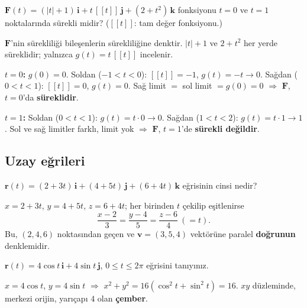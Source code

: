 \begin{soru}
$\mathbf F(t)=(|t|+1)\,\mathbf i+t\,[\![t]\!]\,\mathbf j+(2+t^2)\,\mathbf k$ fonksiyonu $t=0$ ve $t=1$ noktalarında sürekli midir?
($[\![t]\!]$: tam değer fonksiyonu.)
\end{soru}
\begin{cevap}
$\mathbf F$'nin sürekliliği bileşenlerin sürekliliğine denktir. $|t|+1$ ve $2+t^2$ her yerde süreklidir; yalnızca
$g(t)=t\,[\![t]\!]$ incelenir.

\textbf{$t=0$:} $g(0)=0$. Soldan ($-1<t<0$): $[\![t]\!]=-1$, $g(t)=-t\to0$. Sağdan ($0<t<1$): $[\![t]\!]=0$, $g(t)=0$.
Sağ limit $=$ sol limit $=g(0)=0$ $\Rightarrow$ $\mathbf F$, $t=0$'da \textbf{süreklidir}.

\textbf{$t=1$:} Soldan ($0<t<1$): $g(t)=t\cdot0\to0$. Sağdan ($1<t<2$): $g(t)=t\cdot1\to1$. Sol ve sağ limitler farklı, limit yok
$\Rightarrow$ $\mathbf F$, $t=1$'de \textbf{sürekli değildir}.
\end{cevap}

\subsection{Uzay eğrileri}

\begin{soru}
$\mathbf r(t)=(2+3t)\,\mathbf i+(4+5t)\,\mathbf j+(6+4t)\,\mathbf k$ eğrisinin cinsi nedir?
\end{soru}
\begin{cevap}
$x=2+3t$, $y=4+5t$, $z=6+4t$; her birinden $t$ çekilip eşitlenirse
\[ \frac{x-2}{3}=\frac{y-4}{5}=\frac{z-6}{4}\ (=t) . \]
Bu, $(2,4,6)$ noktasından geçen ve $\mathbf v=(3,5,4)$ vektörüne paralel \textbf{doğrunun} denklemidir.
\end{cevap}

\begin{soru}
$\mathbf r(t)=4\cos t\,\mathbf i+4\sin t\,\mathbf j$, $0\le t\le2\pi$ eğrisini tanıyınız.
\end{soru}
\begin{cevap}
$x=4\cos t$, $y=4\sin t$ $\Rightarrow$ $x^2+y^2=16(\cos^2t+\sin^2t)=16$. $xy$ düzleminde, merkezi orijin, yarıçapı $4$ olan \textbf{çember}.
\end{cevap}

